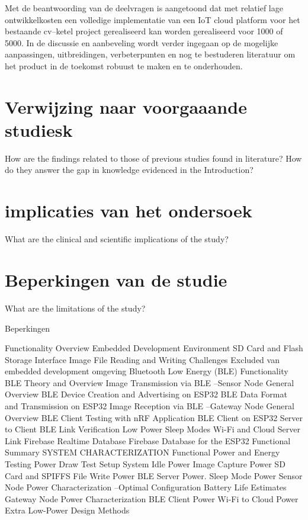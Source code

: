 		Met de beantwoording van de deelvragen is aangetoond dat met relatief lage ontwikkelkosten een volledige implementatie van een IoT cloud platform voor het bestaande cv–ketel project gerealiseerd kan worden gerealiseerd voor 1000 of 5000. In de discussie en aanbeveling wordt verder ingegaan op de mogelijke aanpassingen, uitbreidingen, verbeterpunten en nog te bestuderen literatuur om het product in de toekomst robuust te maken en te onderhouden.
		\section{Verwijzing naar voorgaaande studiesk}
		How are the findings related to those of previous studies found in literature? How do they answer the gap in knowledge evidenced in the Introduction?
		
		\section{implicaties van het ondersoek}
		
		What are the clinical and scientific implications of the study?
		
		\section{Beperkingen van de studie}
		What are the limitations of the study?
		
		
		Beperkingen
		
		Functionality Overview
		Embedded Development Environment
		SD Card and Flash Storage Interface
		Image File Reading and Writing
		Challenges
		Excluded van embedded development omgeving
		Bluetooth Low Energy (BLE) Functionality
		BLE Theory and Overview
		Image Transmission via BLE –Sensor Node
		General Overview
		BLE Device Creation and Advertising on ESP32
		BLE Data Format and Transmission on ESP32
		Image Reception via BLE –Gateway Node
		General Overview
		BLE Client Testing with nRF Application
		BLE Client on ESP32
		Server to Client BLE Link Verification
		Low Power Sleep Modes
		Wi-Fi and Cloud Server Link
		Firebase Realtime Database
		Firebase Database for the ESP32
		Functional Summary
		SYSTEM CHARACTERIZATION
		Functional Power and Energy Testing
		Power Draw Test Setup
		System Idle Power
		Image Capture Power
		SD Card and SPIFFS File Write Power
		BLE Server Power.
		Sleep Mode Power
		Sensor Node Power Characterization –Optimal Configuration
		Battery Life Estimates
		Gateway Node Power Characterization
		BLE Client Power
		Wi-Fi to Cloud Power
		Extra Low-Power Design Methods
		
